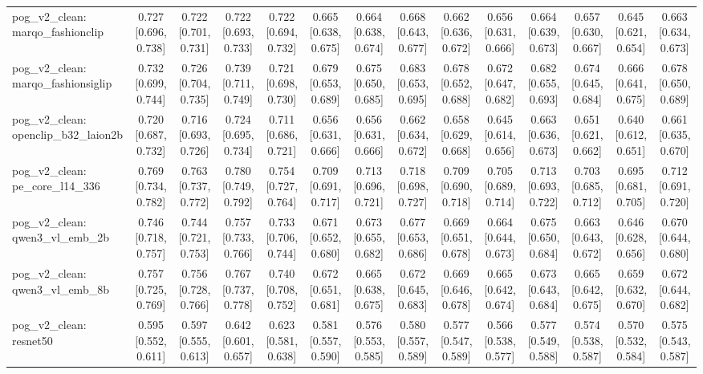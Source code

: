 \begin{table}[t]
\begin{tabular}{lccccccccccccc}
pog\_v2\_clean: marqo\_fashionclip & 0.727 [0.696, 0.738] & 0.722 [0.701, 0.731] & 0.722 [0.693, 0.733] & 0.722 [0.694, 0.732] & 0.665 [0.638, 0.675] & 0.664 [0.638, 0.674] & 0.668 [0.643, 0.677] & 0.662 [0.636, 0.672] & 0.656 [0.631, 0.666] & 0.664 [0.639, 0.673] & 0.657 [0.630, 0.667] & 0.645 [0.621, 0.654] & 0.663 [0.634, 0.673] \\
pog\_v2\_clean: marqo\_fashionsiglip & 0.732 [0.699, 0.744] & 0.726 [0.704, 0.735] & 0.739 [0.711, 0.749] & 0.721 [0.698, 0.730] & 0.679 [0.653, 0.689] & 0.675 [0.650, 0.685] & 0.683 [0.653, 0.695] & 0.678 [0.652, 0.688] & 0.672 [0.647, 0.682] & 0.682 [0.655, 0.693] & 0.674 [0.645, 0.684] & 0.666 [0.641, 0.675] & 0.678 [0.650, 0.689] \\
pog\_v2\_clean: openclip\_b32\_laion2b & 0.720 [0.687, 0.732] & 0.716 [0.693, 0.726] & 0.724 [0.695, 0.734] & 0.711 [0.686, 0.721] & 0.656 [0.631, 0.666] & 0.656 [0.631, 0.666] & 0.662 [0.634, 0.672] & 0.658 [0.629, 0.668] & 0.645 [0.614, 0.656] & 0.663 [0.636, 0.673] & 0.651 [0.621, 0.662] & 0.640 [0.612, 0.651] & 0.661 [0.635, 0.670] \\
pog\_v2\_clean: pe\_core\_l14\_336 & 0.769 [0.734, 0.782] & 0.763 [0.737, 0.772] & 0.780 [0.749, 0.792] & 0.754 [0.727, 0.764] & 0.709 [0.691, 0.717] & 0.713 [0.696, 0.721] & 0.718 [0.698, 0.727] & 0.709 [0.690, 0.718] & 0.705 [0.689, 0.714] & 0.713 [0.693, 0.722] & 0.703 [0.685, 0.712] & 0.695 [0.681, 0.705] & 0.712 [0.691, 0.720] \\
pog\_v2\_clean: qwen3\_vl\_emb\_2b & 0.746 [0.718, 0.757] & 0.744 [0.721, 0.753] & 0.757 [0.733, 0.766] & 0.733 [0.706, 0.744] & 0.671 [0.652, 0.680] & 0.673 [0.655, 0.682] & 0.677 [0.653, 0.686] & 0.669 [0.651, 0.678] & 0.664 [0.644, 0.673] & 0.675 [0.650, 0.684] & 0.663 [0.643, 0.672] & 0.646 [0.628, 0.656] & 0.670 [0.644, 0.680] \\
pog\_v2\_clean: qwen3\_vl\_emb\_8b & 0.757 [0.725, 0.769] & 0.756 [0.728, 0.766] & 0.767 [0.737, 0.778] & 0.740 [0.708, 0.752] & 0.672 [0.651, 0.681] & 0.665 [0.638, 0.675] & 0.672 [0.645, 0.683] & 0.669 [0.646, 0.678] & 0.665 [0.642, 0.674] & 0.673 [0.643, 0.684] & 0.665 [0.642, 0.675] & 0.659 [0.632, 0.670] & 0.672 [0.644, 0.682] \\
pog\_v2\_clean: resnet50 & 0.595 [0.552, 0.611] & 0.597 [0.555, 0.613] & 0.642 [0.601, 0.657] & 0.623 [0.581, 0.638] & 0.581 [0.557, 0.590] & 0.576 [0.553, 0.585] & 0.580 [0.557, 0.589] & 0.577 [0.547, 0.589] & 0.566 [0.538, 0.577] & 0.577 [0.549, 0.588] & 0.574 [0.538, 0.587] & 0.570 [0.532, 0.584] & 0.575 [0.543, 0.587] \\

\end{tabular}
\end{table}
